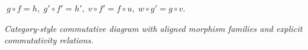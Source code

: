 \begin{center}
    \resizebox{0.70\linewidth}{!}{}

    \smallskip
    \scriptsize \(\;g\circ f=h,\; g'\circ f'=h',\; v\circ f'=f\circ u,\; w\circ g'=g\circ v.\)

    \medskip
    \textit{Category-style commutative diagram with aligned morphism families and explicit commutativity relations.}
\end{center}

